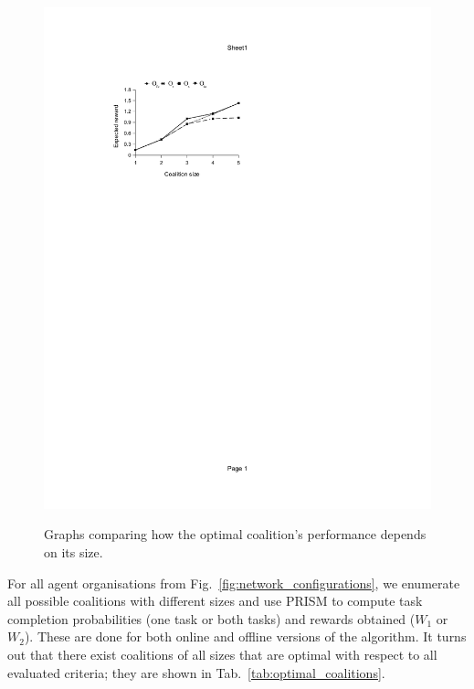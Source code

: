 \documentclass{llncs}
\begin{document}
\begin{figure}[t]
{\includegraphics[clip=true, trim=101 520 280 115, scale=0.65]{images/w2_stpg_online}
}
\caption{Graphs comparing how the optimal coalition's performance depends on its size.
}
\label{fig:coalition_performance}
\end{figure}
%
For all agent organisations from Fig.~\ref{fig:network_configurations}, we enumerate all possible coalitions with different sizes and use PRISM to compute task completion probabilities (one task or both tasks) and rewards obtained ($W_1$ or $W_2$). These are done for both online and offline versions of the algorithm. It turns out that there exist coalitions of all sizes that are optimal with respect to all evaluated criteria; they are shown in Tab.~\ref{tab:optimal_coalitions}.
\end{document}
